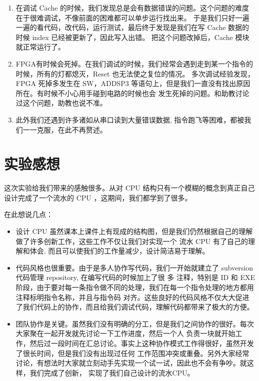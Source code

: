 \documentclass[10pt]{article}
\begin{document}
\begin{CJK}{UTF8}{gbsn}
\begin{enumerate}
\item 在调试 Cache 的时候，我们发现总是会有数据错误的问题。这个问题的难度在于很难调试，不像前面的困难都可以单步运行找出来。
于是我们只好一遍一遍的看代码，改代码，运行测试，最后终于发现是我们在写 Cache 数据的时候 index 已经被更新了，因此写入出错。
把这个问题改掉后，Cache 模块就正常运行了。

\item FPGA有时候会死掉。在我们调试的时候，我们经常会遇到走到某一个指令的时候，所有的灯都熄灭，Reset 也无法使之复位的情况。
多次调试经验发现，FPGA 死掉多发生在 SW，ADDSP3 等语句上，但是我们一直没有找出原因所在。有时候不小心用手碰到电路的时候也会
发生死掉的问题。和助教讨论过这个问题，助教也说不准。

\item 此外我们还遇到许多诸如从串口读到大量错误数据,  指令跑飞等困难，都被我们一一克服，在此不再赘述。
\end{enumerate}

\section{实验感想}
这次实验给我们带来的感触很多。从对 CPU 结构只有一个模糊的概念到真正自己设计完成了一个流水的 CPU ，这期间，我们都学到了很多。

在此想说几点：\\

\begin{itemize}
\item 设计 CPU 虽然课本上课件上有现成的结构图，但是我们仍然根据自己的理解做了许多创新工作，这些工作不仅让我们对实现一个
流水 CPU 有了自己的理解和体会, 而且可以使我们的工作量减少，设计简洁易于理解。

\item 代码风格也很重要。由于是多人协作写代码，我们一开始就建立了 subversion 代码管理 repository, 在编写代码的时候加上了很
多 注释，特别是 ID 和 EXE 阶段，由于要对每一条指令做不同的处理，我们在每一个指令处理的地方都用注释标明指令名称，并且与指令码
对齐。这些良好的代码风格不仅大大促进了我们代码上的协作，而且给我们调试代码，理解代码都带来了极大的方便。

\item 团队协作是关键。虽然我们没有明确的分工，但是我们之间协作的很好。每次大家聚在一起开发就先讨论一下工作进度，然后一个人
负责一块就开始工作，然后过一段时间在汇总讨论。事实上这种协作模式工作得很好，虽然开发了很长时间，但是我们没有出现过任何
工作范围冲突或重叠。另外大家经常讨论，有想法时大家就立刻动手先实现一个试一试，因此也不会有争吵。就这样，我们完成了创新，
实现了我们自己设计的流水CPU。


\end{itemize}
\end{CJK}
\end{document}
